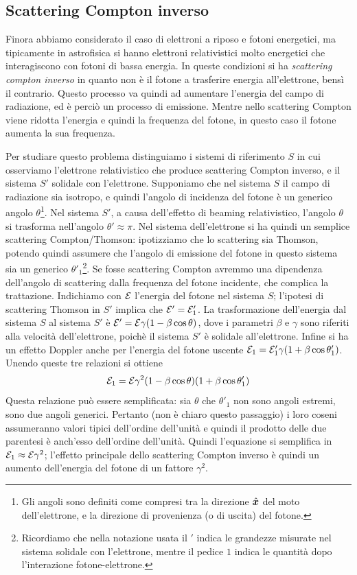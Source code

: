 \subsection{Scattering Compton inverso}
Finora abbiamo considerato il caso di elettroni a riposo e fotoni energetici, ma tipicamente in astrofisica si hanno elettroni relativistici molto energetici che interagiscono con fotoni di bassa energia. In queste condizioni si ha \textit{scattering compton inverso} in quanto non è il fotone a trasferire energia all'elettrone, bensì il contrario. Questo processo va quindi ad aumentare l'energia del campo di radiazione, ed è perciò un processo di emissione. Mentre nello scattering Compton viene ridotta l'energia e quindi la frequenza del fotone, in questo caso il fotone aumenta la sua frequenza.

Per studiare questo problema distinguiamo i sistemi di riferimento $S$ in cui osserviamo l'elettrone relativistico che produce scattering Compton inverso, e il sistema $S'$ solidale con l'elettrone. Supponiamo che nel sistema $S$ il campo di radiazione sia isotropo, e quindi l'angolo di incidenza del fotone è un generico angolo $\theta$\footnote{Gli angoli sono definiti come compresi tra la direzione $\vers{x}$ del moto dell'elettrone, e la direzione di provenienza (o di uscita) del fotone.}. Nel sistema $S'$, a causa dell'effetto di beaming relativistico, l'angolo $\theta$ si trasforma nell'angolo $\theta'\approx\pi$. Nel sistema dell'elettrone si ha quindi un semplice scattering Compton/Thomson: ipotizziamo che lo scattering sia Thomson, potendo quindi assumere che l'angolo di emissione del fotone in questo sistema sia un generico $\theta'_1$\footnote{Ricordiamo che nella notazione usata il $'$ indica le grandezze misurate nel sistema solidale con l'elettrone, mentre il pedice $1$ indica le quantità dopo l'interazione fotone-elettrone.}. Se fosse scattering Compton avremmo una dipendenza dell'angolo di scattering dalla frequenza del fotone incidente, che complica la trattazione. Indichiamo con $\mathcal{E}$ l'energia del fotone nel sistema $S$; l'ipotesi di scattering Thomson in $S'$ implica che $\mathcal{E}' = \mathcal{E}'_1$. La trasformazione dell'energia dal sistema $S$ al sistema $S'$ è $\mathcal{E}' = \mathcal{E}\gamma(1-\beta\cos\theta)$, dove i parametri $\beta$ e $\gamma$ sono riferiti alla velocità dell'elettrone, poichè il sistema $S'$ è solidale all'elettrone. Infine si ha un effetto Doppler anche per l'energia del fotone uscente $\mathcal{E}_1 = \mathcal{E}'_1\gamma(1+\beta\cos\theta'_1)$. Unendo queste tre relazioni si ottiene
\begin{equation}
\mathcal{E}_1 = \mathcal{E}\gamma^2(1-\beta\cos\theta)(1+\beta\cos\theta'_1)
\end{equation}
Questa relazione può essere semplificata: sia $\theta$ che $\theta'_1$ non sono angoli estremi, sono due angoli generici. Pertanto (non è chiaro questo passaggio) i loro coseni assumeranno valori tipici dell'ordine dell'unità e quindi il prodotto delle due parentesi è anch'esso dell'ordine dell'unità. Quindi l'equazione si semplifica in $\mathcal{E}_1\approx\mathcal{E}\gamma^2$; l'effetto principale dello scattering Compton inverso è quindi un aumento dell'energia del fotone di un fattore $\gamma^2$.

